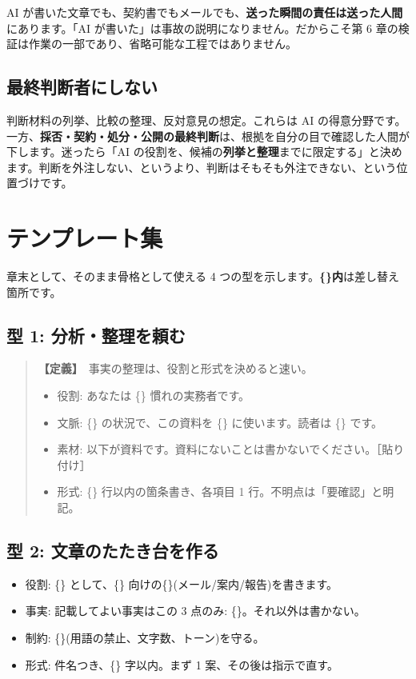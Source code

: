 \documentclass{article}
\begin{document}
AI が書いた文章でも、契約書でもメールでも、\textbf{送った瞬間の責任は送った人間}にあります。「AI が書いた」は事故の説明になりません。だからこそ第 6 章の検証は作業の一部であり、省略可能な工程ではありません。

\subsection{最終判断者にしない}

判断材料の列挙、比較の整理、反対意見の想定。これらは AI の得意分野です。一方、\textbf{採否・契約・処分・公開の最終判断}は、根拠を自分の目で確認した人間が下します。迷ったら「AI の役割を、候補の\textbf{列挙と整理}までに限定する」と決めます。判断を外注しない、というより、判断はそもそも外注できない、という位置づけです。

\section{テンプレート集}

章末として、そのまま骨格として使える 4 つの型を示します。\textbf{\{\}内}は差し替え箇所です。

\subsection{型 1: 分析・整理を頼む}

\begin{quote}
\textbf{【定義】}\ 事実の整理は、役割と形式を決めると速い。
\begin{itemize}
\item 役割: あなたは \{\} 慣れの実務者です。
\item 文脈: \{\} の状況で、この資料を \{\} に使います。読者は \{\} です。
\item 素材: 以下が資料です。資料にないことは書かないでください。［貼り付け］
\item 形式: \{\} 行以内の箇条書き、各項目 1 行。不明点は「要確認」と明記。
\end{itemize}
\end{quote}

\subsection{型 2: 文章のたたき台を作る}

\begin{itemize}
\item 役割: \{\} として、\{\} 向けの\{\}(メール/案内/報告)を書きます。
\item 事実: 記載してよい事実はこの 3 点のみ: \{\}。それ以外は書かない。
\item 制約: \{\}(用語の禁止、文字数、トーン)を守る。
\item 形式: 件名つき、\{\} 字以内。まず 1 案、その後は指示で直す。
\end{itemize}
\end{document}
